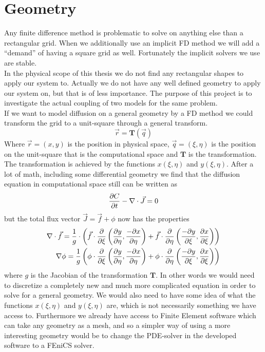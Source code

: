 \section{Geometry}\label{geometry}
Any finite difference method is problematic to solve on anything else than a rectangular grid. 
When we additionally use an implicit FD method we will add a ``demand'' of having a square grid as well. 
Fortunately the implicit solvers we use are stable. \\
In the physical scope of this thesis we do not find any rectangular shapes to apply our system to. 
Actually we do not have any well defined geometry to apply our system on, but that is of less importance. 
The purpose of this project is to investigate the actual coupling of two models for the same problem. \\
If we want to model diffusion on a general geometry by a FD method we could transform the grid to a unit-square through a general transform.
\begin{equation*}
 \vec{r} = \mathbf{T}(\vec{q})
\end{equation*}
Where $\vec{r} = (x,y)$ is the position in physical space, $\vec{q} = (\xi,\eta)$ is the position on the unit-square that is the computational space and $\mathbf{T}$  is the transformation. The transformation is achieved by the functions $x(\xi,\eta)$ and $y(\xi,\eta)$. After a lot of math, including some differential geometry we find that the diffusion equation in computational space still can be written as
\begin{equation*}
 \frac{\partial C}{\partial t} -\nabla\cdot\vec{J} = 0
\end{equation*}
but the total flux vector $\vec{J} = \vec{f} + \phi$ now has the properties
\begin{align*}
 \nabla\cdot\vec{f} = \frac{1}{g}\cdot\left(\vec{f}\cdot\frac{\partial}{\partial\xi}\left(\frac{\partial y}{\partial\eta},\frac{-\partial x}{\partial \eta}\right) + \vec{f}\cdot\frac{\partial}{\partial\eta}\left(\frac{-\partial y}{\partial\xi},\frac{\partial x}{\partial \xi}\right)\right) \\
 \nabla\phi = \frac{1}{g}\left(\phi\cdot\frac{\partial}{\partial\xi}\left(\frac{\partial y}{\partial\eta},\frac{-\partial x}{\partial\eta}\right)+\phi\cdot\frac{\partial}{\partial\eta}\left(\frac{-\partial y}{\partial\xi},\frac{\partial x}{\partial\xi}\right)\right)
\end{align*}
where $g$ is the Jacobian of the transformation $\mathbf{T}$. In other words we would need to discretize a completely new and much more complicated equation in order to solve for a general geometry. We would also need to have some idea of what the functions $x(\xi,\eta)$ and $y(\xi,\eta)$ are, which is not necessarily something we have access to. 
Furthermore we already have access to Finite Element software which can take any geometry as a mesh, and so a simpler way of using a more interesting geometry would be to change the PDE-solver in the developed software to a FEniCS solver.


